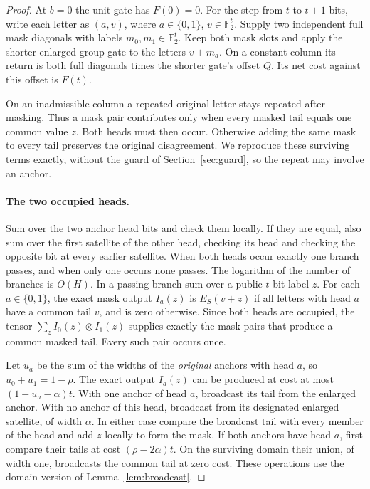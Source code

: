 \begin{proof}
At \(b=0\) the unit gate has \(F(0)=0\). For the step from \(t\)
to \(t+1\) bits, write each letter as \((a,v)\), where
\(a\in\{0,1\}\), \(v\in\mathbb F_2^t\). Supply two independent
full mask diagonals with labels \(m_0,m_1\in\mathbb F_2^t\).
Keep both mask slots and apply the shorter enlarged-group gate to the
letters \(v+m_a\). On a constant column its return is both full
diagonals times the shorter gate's offset \(Q\). Its net cost against
this offset is \(F(t)\).

On an inadmissible column a repeated original letter stays repeated
after masking. Thus a mask pair contributes only when every masked
tail equals one common value \(z\). Both heads must then occur.
Otherwise adding the same mask to every tail preserves the original
disagreement. We reproduce these surviving terms exactly, without the
guard of Section~\ref{sec:guard}, so the repeat may involve an anchor.

\paragraph{The two occupied heads.}
Sum over the two anchor head bits and check them locally. If they
are equal, also sum over the first satellite of the other head, checking
its head and checking the opposite bit at every earlier satellite.
When both heads occur exactly one branch passes, and when only one
occurs none passes. The logarithm of the number of branches is \(O(H)\).
In a passing branch sum over a public \(t\)-bit label \(z\). For each
\(a\in\{0,1\}\), the exact mask output \(I_a(z)\) is \(E_S(v+z)\)
if all letters with head \(a\) have a common tail \(v\), and is zero
otherwise. Since both heads are occupied, the tensor
\(\sum_z I_0(z)\otimes I_1(z)\) supplies exactly the mask pairs that
produce a common masked tail. Every such pair occurs once.

Let \(u_a\) be the sum of the widths of the \emph{original} anchors
with head \(a\), so \(u_0+u_1=1-\rho\). The exact output \(I_a(z)\)
can be produced at cost at most \((1-u_a-\alpha)t\).
With one anchor of head \(a\), broadcast its tail from the enlarged
anchor. With no anchor of this head, broadcast from its designated
enlarged satellite, of width \(\alpha\). In either case compare the
broadcast tail with every member of the head and add \(z\) locally
to form the mask. If both anchors have head \(a\), first compare their
tails at cost \((\rho-2\alpha)t\). On the surviving domain their
union, of width one, broadcasts the common tail at zero cost.
These operations use the domain version of Lemma~\ref{lem:broadcast}.


\end{proof}
